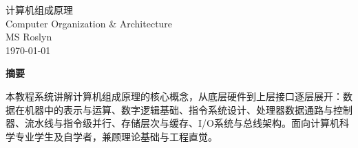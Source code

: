 \documentclass[12pt,a4paper]{ctexart}
\begin{document}
\clearpage
\vspace*{\fill}

\begin{center}
{\huge 计算机组成原理}\\[0.8em]
{\large Computer Organization \& Architecture}\\[2.5em]
{\large MS Roslyn}\\[0.6em]
{\large \today}
\end{center}

\vspace{2.5em}

\begin{center}
{\bfseries 摘要}
\end{center}

\vspace{1em}

\begin{center}
本教程系统讲解计算机组成原理的核心概念，从底层硬件到上层接口逐层展开：数据在机器中的表示与运算、数字逻辑基础、指令系统设计、处理器数据通路与控制器、流水线与指令级并行、存储层次与缓存、I/O系统与总线架构。面向计算机科学专业学生及自学者，兼顾理论基础与工程直觉。
\end{center}

\vspace*{\fill}
\clearpage

\tableofcontents
\clearpage


\clearpage

\clearpage

\clearpage

\clearpage

\clearpage

\clearpage

\clearpage

\clearpage

\end{document}
